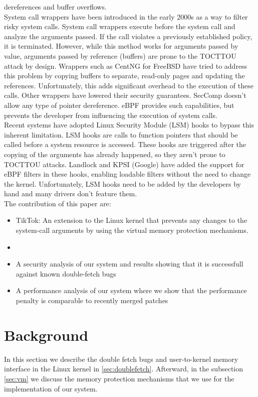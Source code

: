 \documentclass[conference]{IEEEtran}
\begin{document}
dereferences and buffer overflows.
\\
System call wrappers have been introduced in the early 2000s as a way to filter risky system calls. System call wrappers execute before the system call and analyze the arguments passed. If the call violates
a previously established policy, it is terminated. However, while this method works for arguments passed by value, arguments passed by reference (buffers) are prone to the TOCTTOU attack by design. Wrappers such as CentNG for FreeBSD have
tried to address this problem by copying buffers to separate, read-only pages and updating the references. Unfortunately, this adds significant overhead to the execution of these calls. Other wrappers have lowered their security guarantees.
SecComp doesn't allow any type of pointer dereference. eBPF provides such capabilities, but prevents the developer from influencing the execution of system calls.
\\
Recent systems have adopted Linux Security Module (LSM) hooks to bypass this inherent limitation. LSM hooks are calls to function pointers that should be called before a system resource is accessed. These hooks are triggered after the
copying of the arguments has already happened, so they aren't prone to TOCTTOU attacks. Landlock and KPSI (Google) have added the support for eBPF filters in these hooks, enabling loadable filters without the need to change the kernel.
Unfortunately, LSM hooks need to be added by the developers by hand and many drivers don't feature them.
\\
The contribution of this paper are:
\begin{itemize}
\item TikTok: An extension to the Linux kernel that prevents any changes to the system-call arguments by using the virtual memory protection mechanisms.
\item 
\item A security analysis of our system and results showing that it is successfull against known double-fetch bugs
\item A performance analysis of our system where we show that the performance penalty is comparable to recently merged patches
\end{itemize}

\section{Background}
In this section we describe the double fetch bugs and user-to-kernel memory interface in the Linux kernel in \ref{sec:doublefetch}. Afterward, in the subsection \ref{sec:vm} we discuss the memory protection mechanisms that we use for the implementation of our system.
\end{document}
